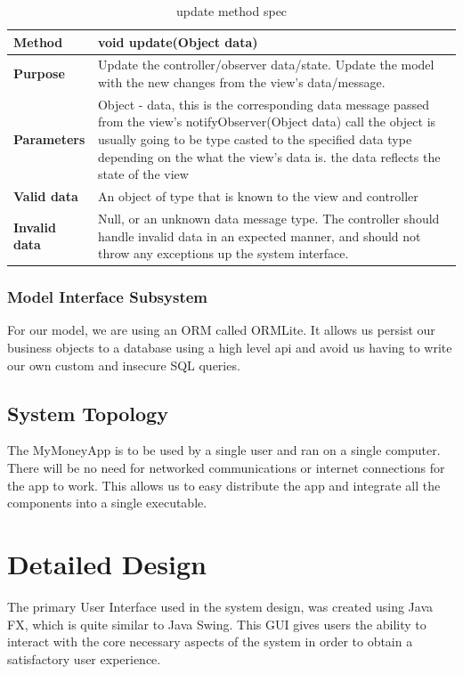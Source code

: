 \documentclass[12pt]{article}
\begin{document}
\begin{table}[H]
  \caption{update method spec}
  \begin{center}
    \begin{tabular}{|l|p{10cm}|}
      \hline
      \bf Method & void update(Object data)\\
		\hline
      \bf Purpose & Update the controller/observer data/state. Update the model with the new changes from the view’s data/message.\\
		\hline
      \bf Parameters & Object - data, this is the corresponding data message passed from the view's notifyObserver(Object data) call the object is usually going to be type casted to the specified data type depending on the what the view's data is. the data reflects the state of the view\\
		\hline
      \bf Valid data & An object of type that is known to the view and controller\\
      \hline
      \bf Invalid data &  Null, or an unknown data message type. The controller should handle invalid data in an expected manner, and should not throw any exceptions up the system interface.\\
      \hline

    \end{tabular}
  \end{center}
\end{table}


\subsubsection{Model Interface Subsystem}
For our model, we are using an ORM called ORMLite. It allows us persist our business objects to a database using a high level api and avoid us having to write our own custom and insecure SQL queries. 

\subsection{System Topology}
The MyMoneyApp is to be used by a single user and ran on a single computer. There will be no need for networked communications or internet connections for the app to work. This allows us to easy distribute the app and integrate all the components into a single executable.


\section{Detailed Design}
The primary User Interface used in the system design, was created using Java FX, which is quite similar to Java Swing. This GUI gives users the ability to interact with the core necessary aspects of the system in order to obtain a satisfactory user experience.\\
\end{document}
